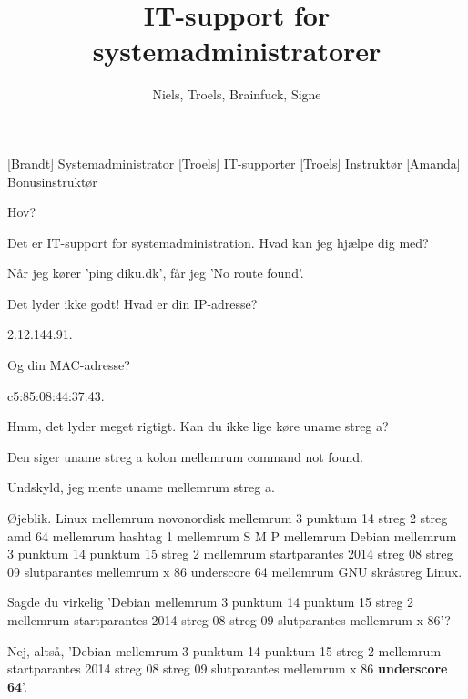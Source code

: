 \documentclass[a4paper,11pt]{article}
\title{IT-support for systemadministratorer}
\author{Niels, Troels, Brainfuck, Signe}
\begin{document}
\maketitle

\begin{roles}
[Brandt] Systemadministrator
[Troels] IT-supporter
[Troels] Instruktør
[Amanda] Bonusinstruktør
\end{roles}

\begin{sketch}



 Hov?


 Det er IT-support for systemadministration.  Hvad kan jeg hjælpe dig
med?

 Når jeg kører 'ping diku.dk', får jeg 'No route found'.

 Det lyder ikke godt!  Hvad er din IP-adresse?

 2.12.144.91.

 Og din MAC-adresse?

 c5:85:08:44:37:43.

 Hmm, det lyder meget rigtigt.  Kan du ikke lige køre uname streg a?

 Den siger uname streg a kolon mellemrum command not found.

 Undskyld, jeg mente uname mellemrum streg a.

 Øjeblik.  Linux mellemrum novonordisk mellemrum 3 punktum
14 streg 2 streg amd 64 mellemrum hashtag 1 mellemrum S M P mellemrum Debian
mellemrum 3 punktum 14 punktum 15 streg 2 mellemrum startparantes 2014 streg 08
streg 09 slutparantes mellemrum x 86 underscore 64 mellemrum GNU skråstreg
Linux.


 Sagde du virkelig 'Debian mellemrum 3 punktum 14 punktum 15 streg 2
mellemrum startparantes 2014 streg 08 streg 09 slutparantes mellemrum x 86'?


 Nej, altså, 'Debian mellemrum 3 punktum 14 punktum 15 streg 2
mellemrum startparantes 2014 streg 08 streg 09 slutparantes mellemrum x 86
\textbf{underscore 64}'.


\end{sketch}
\end{document}
